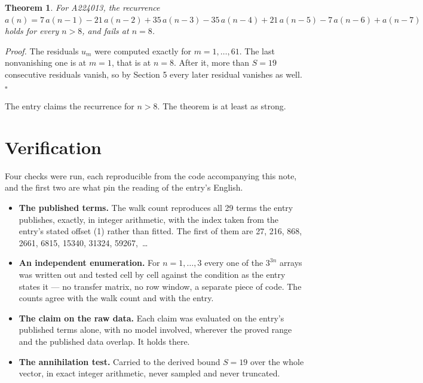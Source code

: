 \documentclass[11pt]{article}
\newtheorem{theorem}{Theorem}
\theoremstyle{definition}
\begin{document}
\begin{theorem} For A224013, the recurrence $a(n) = 7\,a(n-1) - 21\,a(n-2) + 35\,a(n-3) - 35\,a(n-4) + 21\,a(n-5) - 7\,a(n-6) + a(n-7)$ holds for every $n > 8$, and fails at $n = 8$.\end{theorem}

{\itshape Proof.} The residuals $u_m$ were computed exactly for $m = 1,\dots,61$. The last nonvanishing one is at $m = 1$, that is at $n = 8$. After it, more than $S = 19$ consecutive residuals vanish, so by Section 5 every later residual vanishes as well. $\square$

The entry claims the recurrence for $n > 8$. The theorem is at least as strong.

\section{Verification}

Four checks were run, each reproducible from the code accompanying this note, and the first two are what pin the reading of the entry's English.

\begin{itemize}

\item {\bfseries The published terms.} The walk count reproduces all 29 terms the entry publishes, exactly, in integer arithmetic, with the index taken from the entry's stated offset (1) rather than fitted. The first of them are 27, 216, 868, 2661, 6815, 15340, 31324, 59267,~\dots

\item {\bfseries An independent enumeration.} For $n = 1,\dots,3$ every one of the $3^{3n}$ arrays was written out and tested cell by cell against the condition as the entry states it --- no transfer matrix, no row window, a separate piece of code. The counts agree with the walk count and with the entry.

\item {\bfseries The claim on the raw data.} Each claim was evaluated on the entry's published terms alone, with no model involved, wherever the proved range and the published data overlap. It holds there.

\item {\bfseries The annihilation test.} Carried to the derived bound $S = 19$ over the whole vector, in exact integer arithmetic, never sampled and never truncated.

\end{itemize}
\end{document}
